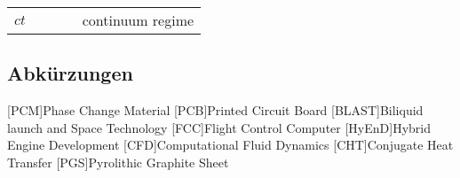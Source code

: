 \begin{supertabular}{p{10mm}p{3mm}p{20mm}p{3mm}l}
$ct$						& &																&	&		continuum regime\\
\end{supertabular} 

\newpage

\subsection*{Abkürzungen}
\begin{acronym}[BLAST]
[PCM]{Phase Change Material}
[PCB]{Printed Circuit Board}
[BLAST]{Biliquid launch and Space Technology}
[FCC]{Flight Control Computer}
[HyEnD]{Hybrid Engine Development}
[CFD]{Computational Fluid Dynamics}
[CHT]{Conjugate Heat Transfer}
[PGS]{Pyrolithic Graphite Sheet}
\end{acronym}
